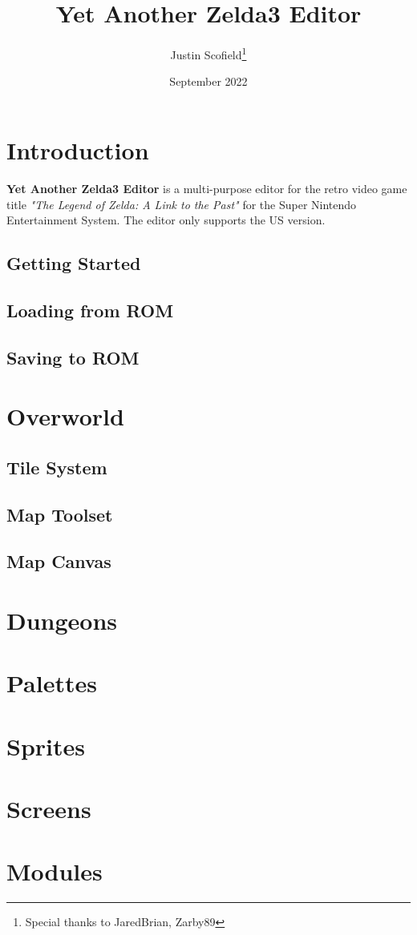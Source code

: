 \documentclass[12pt, oneside]{report}
\title{Yet Another Zelda3 Editor}
\author{Justin Scofield\thanks{Special thanks to JaredBrian, Zarby89}}
\date{September 2022}
\begin{document}
\maketitle

\tableofcontents

\chapter{Introduction}

{\bf Yet Another Zelda3 Editor} is a multi-purpose editor for the retro video game title {\it {"The Legend of Zelda: A Link to the Past"}} for the Super Nintendo Entertainment System. The editor only supports the US version.

\section{Getting Started}
\section{Loading from ROM}
\section{Saving to ROM}

\chapter{Overworld}
  \section{Tile System}
  \section{Map Toolset}
  \section{Map Canvas}

\chapter{Dungeons}
\chapter{Palettes}
\chapter{Sprites}
\chapter{Screens}
\chapter{Modules}
\end{document}

